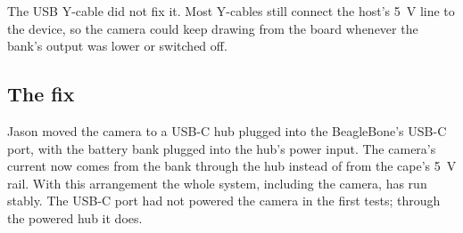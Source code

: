 The USB Y-cable did not fix it. Most Y-cables still connect the host's
\SI{5}{V} line to the device, so the camera could keep drawing from the board
whenever the bank's output was lower or switched off.

\subsection{The fix}

Jason moved the camera to a USB-C hub plugged into the BeagleBone's USB-C
port, with the battery bank plugged into the hub's power input. The camera's
current now comes from the bank through the hub instead of from the cape's
\SI{5}{V} rail. With this arrangement the whole system, including the
camera, has run stably. The USB-C port had not powered the camera in the
first tests; through the powered hub it does.

